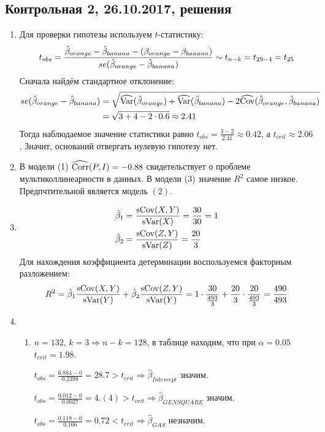 \subsection{Контрольная 2, 26.10.2017, решения}

\begin{enumerate}
\item Для проверки гипотезы используем $t$-статистику:
\[
t_{obs} = \frac{\hat{\beta}_{orange} - \hat{\beta}_{banana} - (\beta_{orange} - \beta_{banana})}{se(\hat{\beta}_{orange} - \hat{\beta}_{banana})} \sim t_{n-k} = t_{29 -4} = t_{25}
\]
Сначала найдём стандартное отклонение:
\begin{align*}
se(\hat{\beta}_{orange} - \hat{\beta}_{banana}) &= \sqrt{\widehat{\operatorname{Var}}(\hat{\beta}_{orange}) + \widehat{\operatorname{Var}}(\hat{\beta}_{banana}) - 2 \widehat{\operatorname{Cov}}(\hat{\beta}_{orange}, \hat{\beta}_{banana})} \\
&= \sqrt{3 + 4 - 2\cdot 0.6} \approx 2.41
\end{align*}
Тогда наблюдаемое значение статистики равно $t_{obs} = \frac{3-2}{2.41} \approx 0.42$,
а $t_{crit} \approx 2.06$. Значит, оснований отвергать нулевую гипотезу нет.
\item В модели (1) $\widehat{\operatorname{Corr}}(P,I)=-0.88$ свидетельствует о проблеме мультиколлинеарности в данных.
В модели (3) значение $R^2$ самое низкое. Предпчтительной является модель $(2)$.
\item
\begin{align*}
\hat \beta_1 &= \frac{\operatorname{sCov}(X,Y)}{\operatorname{sVar}(X)} = \frac{30}{30} = 1 \\
\hat \beta_2 &= \frac{\operatorname{sCov}(Z,Y)}{\operatorname{sVar}(Z)} = \frac{20}{3}
\end{align*}
Для нахождения коэффициента детерминации воспользуемся факторным разложением:
\[
R^2 = \hat{\beta}_1 \frac{\operatorname{sCov}(X,Y)}{\operatorname{sVar}(Y)} + \hat{\beta}_2 \frac{\operatorname{sCov}(Z,Y)}{\operatorname{sVar}(Y)} = 1 \cdot \frac{30}{\frac{493}{3}} + \frac{20}{3} \cdot \frac{20}{\frac{493}{3}} = \frac{490}{493}
\]
\item
\begin{enumerate}
\item $n=132$, $k=3 \Rightarrow n-k = 128$, в таблице находим,
что при $\alpha = 0.05$ $t_{crit} = 1.98$.

$t_{obs} = \frac{6.884 - 0}{0.2398} = 28.7 > t_{crit} \Rightarrow \hat \beta_{Intercept}$ значим.

$t_{obs} = \frac{0.012 - 0}{0.0027} = 4.(4) > t_{crit} \Rightarrow \hat \beta_{GENSQUARE}$ значим.

$t_{obs} = \frac{0.119 - 0}{0.166} = 0.72 < t_{crit} \Rightarrow \hat \beta_{GAS}$ незначим.


\end{enumerate}
\end{enumerate}
